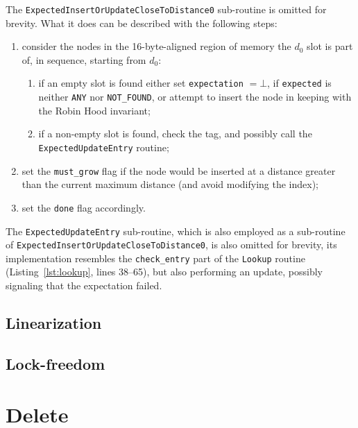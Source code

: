 The \texttt{ExpectedInsertOrUpdateCloseToDistance0} sub-routine is omitted for brevity.
What it does can be described with the following steps:
\begin{enumerate}
	\item consider the nodes in the 16-byte-aligned region of memory the $d_0$ slot is part of, in sequence, starting from $d_0$:
	\begin{enumerate}
		\item if an empty slot is found either set \texttt{expectation} $=\bot$, if \texttt{expected} is neither \texttt{ANY} nor \texttt{{NOT\_FOUND}}, or attempt to insert the node in keeping with the Robin Hood invariant;
		\item if a non-empty slot is found, check the tag, and possibly call the \texttt{ExpectedUpdateEntry} routine;
	\end{enumerate}
	\item set the \texttt{{must\_grow}} flag if the node would be inserted at a distance greater than the current maximum distance (and avoid modifying the index);
	\item set the \texttt{done} flag accordingly.
\end{enumerate}

The \texttt{ExpectedUpdateEntry} sub-routine, which is also employed as a sub-routine of \texttt{ExpectedInsertOrUpdateCloseToDistance0}, is also omitted for brevity, its implementation resembles the \texttt{{check\_entry}} part of the \texttt{Lookup} routine (Listing~\ref{lst:lookup}, lines 38--65), but also performing an update, possibly signaling that the expectation failed.




\subsection{Linearization}\label{subsec:insert-linearization}

\subsection{Lock-freedom}\label{subsec:insert-lock-freedom}


\section{Delete}\label{sec:delete}

